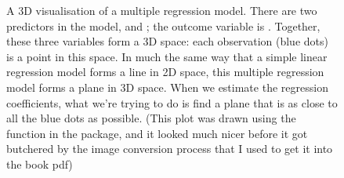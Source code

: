 \begin{figure}[p]
\begin{center}
\caption{A 3D visualisation of a multiple regression model. There are two predictors in the model,  and ; the outcome variable is . Together, these three variables form a 3D space: each observation (blue dots) is a point in this space. In much the same way that a simple linear regression model forms a line in 2D space, this multiple regression model forms a plane in 3D space. When we estimate the regression coefficients, what we're trying to do is find a plane that is as close to all the blue dots as possible. (This plot was drawn using the  function in the  package, and it looked much nicer before it got butchered by the image conversion process that I used to get it into the book pdf)}
\label{fig:multipleregression}
\end{center}
\end{figure}


